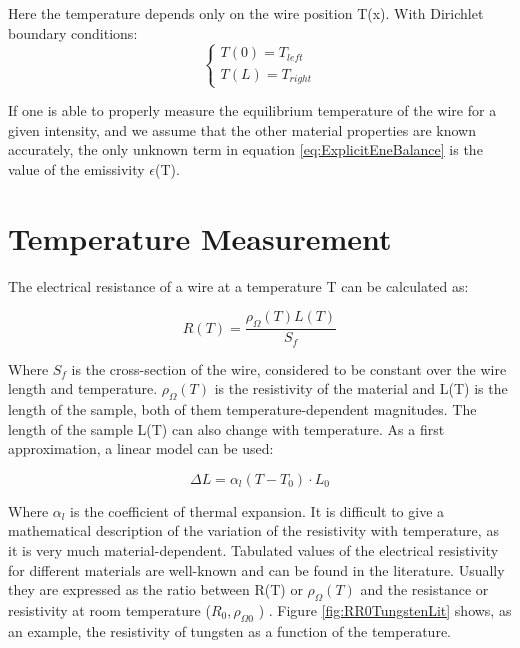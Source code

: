 Here the temperature depends only on the wire position T(x). With Dirichlet boundary conditions: 
\begin{equation}
    \begin{cases} T(0) = T_{left} \\ T(L) = T_{right} \end{cases}
\end{equation}

If one is able to properly measure the equilibrium temperature of the wire for a  given intensity, and we assume that the other material properties are known accurately, the only unknown term in equation \ref{eq:ExplicitEneBalance} is the value of the emissivity $\epsilon$(T). 

\section{Temperature Measurement}
\label{sec:EmissTempMeas}

The electrical resistance of a wire at a temperature T can be calculated as: 

\begin{equation}
    R(T) = \frac{\rho_{\Omega}(T) L(T)}{S_f}
    \label{eq:ResWithT}
\end{equation}

Where $S_f$ is the cross-section of the wire, considered to be constant over the wire length and temperature. $\rho_{\Omega}(T)$ is the resistivity of the material and L(T) is the length of the sample, both of them temperature-dependent magnitudes. The length of the sample L(T) can also change with temperature. As a first approximation, a linear model can be used: 

\begin{equation}
    \Delta L = \alpha_l \left(T - T_0 \right) \cdot L_0
\end{equation}

Where $\alpha_l$ is the coefficient of thermal expansion. It is difficult to give a mathematical description of the variation of the resistivity with temperature, as it is very much material-dependent. Tabulated values of the electrical resistivity for different materials are well-known and can be found in the literature. Usually they are expressed as the ratio between R(T) or $\rho_{\Omega}(T)$ and the resistance or resistivity at room temperature ($R_{0} , \rho_{\Omega 0}$ ) \parencite[][]{ref:HandbookCh}. Figure \ref{fig:RR0TungstenLit} shows, as an example, the resistivity of tungsten as a function of the temperature. 


